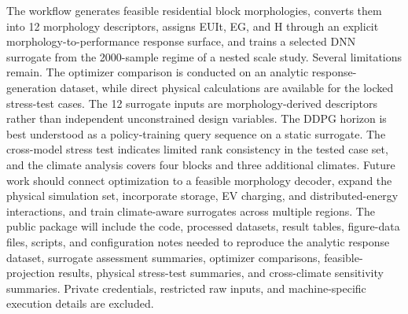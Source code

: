 \documentclass[10pt]{article}
\begin{document}
\begin{revisionbox}
The workflow generates feasible residential block morphologies, converts them into 12 morphology descriptors, assigns EUIt, EG, and H through an explicit morphology-to-performance response surface, and trains a selected DNN surrogate from the 2000-sample regime of a nested scale study.
\revisionseparator
{}
Several limitations remain. The optimizer comparison is conducted on an analytic response-generation dataset, while direct physical calculations are available for the locked stress-test cases. The 12 surrogate inputs are morphology-derived descriptors rather than independent unconstrained design variables. The DDPG horizon is best understood as a policy-training query sequence on a static surrogate. The cross-model stress test indicates limited rank consistency in the tested case set, and the climate analysis covers four blocks and three additional climates. Future work should connect optimization to a feasible morphology decoder, expand the physical simulation set, incorporate storage, EV charging, and distributed-energy interactions, and train climate-aware surrogates across multiple regions.
\revisionseparator
{}
The public package will include the code, processed datasets, result tables, figure-data files, scripts, and configuration notes needed to reproduce the analytic response dataset, surrogate assessment summaries, optimizer comparisons, feasible-projection results, physical stress-test summaries, and cross-climate sensitivity summaries. Private credentials, restricted raw inputs, and machine-specific execution details are excluded.
\end{revisionbox}
\end{document}
